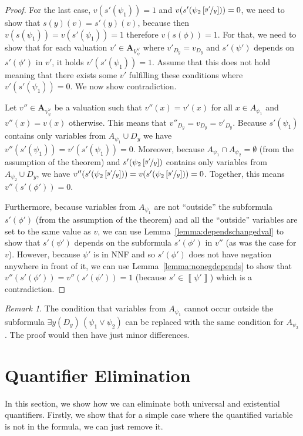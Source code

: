 \documentclass[
  digital, %
  color,
  twoside, %
  table,   %
  nolof,     %
  nolot,     %
]{fithesis3}
\theoremstyle{definition}
\theoremstyle{remark}
\newtheorem*{remark}{Remark}
\newcommand{\seman}[1]{\left\llbracket {#1} \right\rrbracket}
\newcommand{\substitute}[2]{\left[ \nicefrac{#2}{#1} \right]}
\newcommand{\valtns}[1]{\mathbf{A}_{#1}}
\newcommand{\uvars}[1]{V_{#1}^{\forall}}
\newcommand{\itholds}{\,}
\begin{document}
\begin{proof}
  For the last case, $v(s'(\psi_1)) = 1$ and $v(s'(\psi_2\substitute{y}{y'})) = 0$, we need to show that $s(y)(v) = s'(y)(v)$, because then $v(s(\psi_1)) = v(s'(\psi_1)) = 1$ therefore $v(s(\phi)) = 1$. For that, we need to show that for each valuation $v' \in \valtns{\uvars{\psi}}$ where $v'_{D_y} = v_{D_y}$ and $s'(\psi')$ depends on $s'(\phi')$ in $v'$, it holds $v'(s'(\psi_1)) = 1$. Assume that this does not hold meaning that there exists some $v'$ fulfilling these conditions where $v'(s'(\psi_1)) = 0$. We now show contradiction.
  
  Let $v'' \in \valtns{\uvars{\psi}}$ be a valuation such that $v''(x) = v'(x)$ for all $x \in A_{\psi_1}$ and $v''(x) = v(x)$ otherwise. This means that $v''_{D_y} = v_{D_y} = v'_{D_y}$. Because $s'(\psi_1)$ contains only variables from $A_{\psi_1} \cup D_y$ we have $v''(s'(\psi_1)) = v'(s'(\psi_1)) = 0$. Moreover, because $A_{\psi_1} \cap A_{\psi_2} = \emptyset$ (from the assumption of the theorem) and $s'(\psi_2\substitute{y}{y'})$ contains only variables from $A_{\psi_2} \cup D_y$, we have $v''(s'(\psi_2\substitute{y}{y'})) = v(s'(\psi_2\substitute{y}{y'})) = 0$. Together, this means $v''(s'(\phi')) = 0$.
  
  Furthermore, because variables from $A_{\psi_1}$ are not ``outside'' the subformula $s'(\phi')$ (from the assumption of the theorem) and all the ``outside'' variables are set to the same value as $v$, we can use Lemma~\ref{lemma:dependschangedval} to show that $s'(\psi')$ depends on the subformula $s'(\phi')$ in $v''$ (as was the case for $v$). However, because $\psi'$ is in NNF and so $s'(\phi')$ does not have negation anywhere in front of it, we can use Lemma~\ref{lemma:nonegdepends} to show that $v''(s'(\phi')) = v''(s'(\psi')) = 1$ (because $s' \in \seman{\psi'}$) which is a contradiction.
\end{proof}

\begin{remark}
  The condition that variables from $A_{\psi_1}$ cannot occur outside the subformula $\exists y(D_y) \itholds (\psi_1 \lor \psi_2)$ can be replaced with the same condition for $A_{\psi_2}$. The proof would then have just minor differences.
\end{remark}

\section{Quantifier Elimination}
\label{sec:quantElimination}
In this section, we show how we can eliminate both universal and existential quantifiers. Firstly, we show that for a simple case where the quantified variable is not in the formula, we can just remove it.
\end{document}
